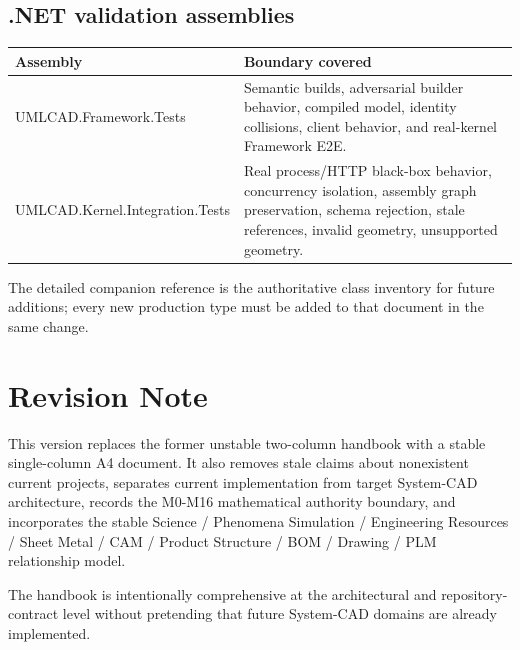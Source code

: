 \documentclass[11pt,a4paper]{report}
\begin{document}
\section{.NET validation assemblies}

\begin{tabularx}{\textwidth}{@{}p{}X@{}}
\toprule
Assembly & Boundary covered \\
\midrule
UMLCAD.Framework.Tests & Semantic builds, adversarial builder behavior, compiled model, identity collisions, client behavior, and real-kernel Framework E2E. \\
UMLCAD.Kernel.Integration.Tests & Real process/HTTP black-box behavior, concurrency isolation, assembly graph preservation, schema rejection, stale references, invalid geometry, unsupported geometry. \\
\bottomrule
\end{tabularx}

The detailed companion reference is the authoritative class inventory for future additions; every new production type must be added to that document in the same change.

\chapter*{Revision Note}
This version replaces the former unstable two-column handbook with a stable single-column A4 document. It also removes stale claims about nonexistent current projects, separates current implementation from target System-CAD architecture, records the M0-M16 mathematical authority boundary, and incorporates the stable Science / Phenomena Simulation / Engineering Resources / Sheet Metal / CAM / Product Structure / BOM / Drawing / PLM relationship model.

The handbook is intentionally comprehensive at the architectural and repository-contract level without pretending that future System-CAD domains are already implemented.
\end{document}
